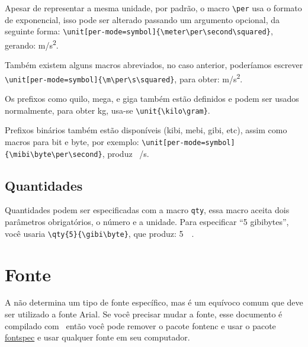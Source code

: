 Apesar de representar a mesma unidade, por padrão, o macro  \verb|\per| usa o formato de exponencial, isso pode ser alterado passando um argumento opcional, da seguinte forma: \verb|\unit[per-mode=symbol]{\meter\per\second\squared}|, gerando: \unit[per-mode=symbol]{\meter\per\second\squared}.

Também existem alguns macros abreviados, no caso anterior, poderíamos escrever
\verb|\unit[per-mode=symbol]{\m\per\s\squared}|, para obter: \unit[per-mode=symbol]{\m\per\s\squared}.

Os prefixos como quilo, mega, e giga também estão definidos e podem ser usados normalmente, para obter  
\unit{\kilo\gram}, usa-se \verb|\unit{\kilo\gram}|. 

Prefixos binários também estão disponíveis (kibi, mebi, gibi, etc), assim como macros para bit e byte, por exemplo: \verb|\unit[per-mode=symbol]{\mibi\byte\per\second}|, produz \unit[per-mode=symbol]{\kibi\byte\per\second}.

\subsection{Quantidades}

Quantidades podem ser especificadas com a macro \texttt{qty}, essa macro aceita dois parâmetros obrigatórios, o número e a unidade. Para especificar \enquote{5 gibibytes}, você usaria \verb|\qty{5}{\gibi\byte}|, que produz: \qty{5}{\gibi\byte}.

\section{Fonte}

A \abnt não determina um tipo de fonte específico, mas é um equívoco comum que deve ser utilizado a fonte Arial. Se você precisar mudar a fonte, esse documento é compilado com \XeLaTeX\ então você pode remover o pacote fontenc e usar o pacote \href{https://ctan.org/pkg/fontspec}{fontspec} e usar qualquer fonte em seu computador.

